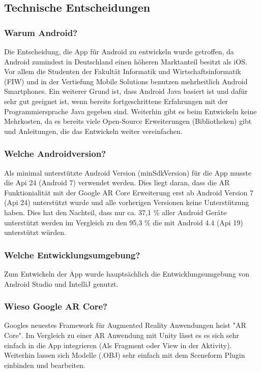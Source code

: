 \documentclass{scrartcl}
\begin{document}
\subsection{Technische Entscheidungen}

\subsubsection{Warum Android?}

Die Entscheidung, die App für Android zu entwickeln wurde getroffen, da Android zumindest in Deutschland einen höheren Marktanteil besitzt als iOS. Vor allem die Studenten der Fakultät Informatik und Wirtschaftsinformatik (FIW) und in der Vertiefung Mobile Solutions benutzen mehrheitlich Android Smartphones. Ein weiterer Grund ist, dass Android Java basiert ist und dafür sehr gut geeignet ist, wenn bereits fortgeschrittene Erfahrungen mit der Programmiersprache Java gegeben sind. Weiterhin gibt es beim Entwickeln keine Mehrkosten, da es bereits viele Open-Source Erweiterungen (Bibliotheken) gibt und Anleitungen, die das Entwickeln weiter vereinfachen.

\subsubsection{Welche Androidversion?}

Als minimal unterstützte Android Version (minSdkVersion) für die App musste die Api 24 (Android 7) verwendet werden. Dies liegt daran, dass die AR Funktionialität mit der Google AR Core Erweiterung erst ab Android Version 7 (Api 24) unterstützt wurde und alle vorherigen Versionen keine Unterstützung haben. Dies hat den Nachteil, dass nur ca. 37,1 \% aller Android Geräte unterstützt werden im Vergleich zu den 95,3 \% die mit Android 4.4 (Api 19) unterstützt würden. 

\subsubsection{Welche Entwicklungsumgebung?}

Zum Entwickeln der App wurde hauptsächlich die Entwicklungsumgebung von Android Studio und IntelliJ genutzt.

\subsubsection{Wieso Google AR Core?}

Googles neuestes Framework für Augmented Reality Anwendungen heist "AR Core". Im Vergleich zu einer AR Anwendung mit Unity lässt es es sich sehr einfach in die App integrieren (Als Fragment oder View in der Aktivity). Weiterhin lassen sich Modelle (.OBJ) sehr einfach mit dem Sceneform Plugin einbinden und bearbeiten. 
\end{document}
